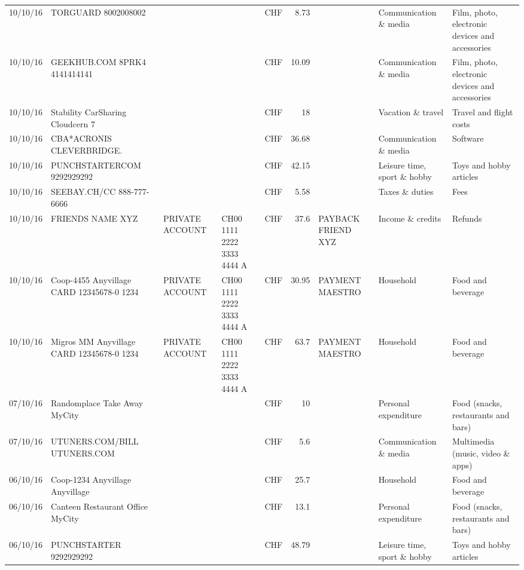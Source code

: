 \begin{landscape}
\begin{table}[h]
\begin{center}
\begin{tabular}{rllllrlll}
		10/10/16 & TORGUARD                 8002008002 &       &       & CHF   & 8.73  &       & Communication \& media & Film, photo, electronic devices and accessories \\
		10/10/16 & GEEKHUB.COM  8PRK4        4141414141 &       &       & CHF   & 10.09 &       & Communication \& media & Film, photo, electronic devices and accessories \\
		10/10/16 & Stability CarSharing      Cloudcern 7 &       &       & CHF   & 18    &       & Vacation \& travel & Travel and flight costs \\
		10/10/16 & CBA*ACRONIS              CLEVERBRIDGE. &       &       & CHF   & 36.68 &       & Communication \& media & Software \\
		10/10/16 & PUNCHSTARTERCOM           9292929292 &       &       & CHF   & 42.15 &       & Leisure time, sport \& hobby & Toys and hobby articles \\
		10/10/16 & SEEBAY.CH/CC               888-777-6666 &       &       & CHF   & 5.58  &       & Taxes \& duties & Fees \\
		10/10/16 & FRIENDS NAME XYZ & PRIVATE ACCOUNT & CH00 1111 2222 3333 4444 A & CHF   & 37.6  & PAYBACK FRIEND XYZ & Income \& credits & Refunds \\
		10/10/16 & Coop-4455 Anyvillage CARD 12345678-0 1234 & PRIVATE ACCOUNT & CH00 1111 2222 3333 4444 A & CHF   & 30.95 & PAYMENT MAESTRO & Household & Food and beverage \\
		10/10/16 & Migros MM Anyvillage CARD 12345678-0 1234 & PRIVATE ACCOUNT & CH00 1111 2222 3333 4444 A & CHF   & 63.7  & PAYMENT MAESTRO & Household & Food and beverage \\
		07/10/16 & Randomplace Take Away     MyCity &       &       & CHF   & 10    &       & Personal expenditure & Food (snacks, restaurants and bars) \\
		07/10/16 & UTUNERS.COM/BILL          UTUNERS.COM &       &       & CHF   & 5.6   &       & Communication \& media & Multimedia (music, video \& apps) \\
		06/10/16 & Coop-1234 Anyvillage    Anyvillage &       &       & CHF   & 25.7  &       & Household & Food and beverage \\
		06/10/16 & Canteen Restaurant Office      MyCity &       &       & CHF   & 13.1  &       & Personal expenditure & Food (snacks, restaurants and bars) \\
		06/10/16 & PUNCHSTARTER     9292929292 &       &       & CHF   & 48.79 &       & Leisure time, sport \& hobby & Toys and hobby articles \\

\end{tabular}
\end{center}
\end{table}
\end{landscape}
